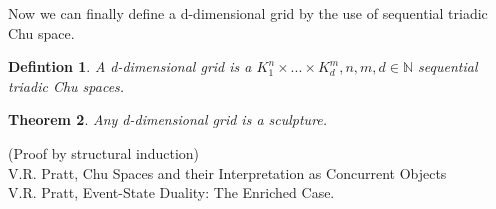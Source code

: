 \documentclass[a4paper,11pt]{article}
\newtheorem{theorem}{Theorem}
\newtheorem{lemma}[theorem]{Lemma}
\newtheorem{definition}[theorem]{Defintion}
\begin{document}

Now we can finally define a d-dimensional grid by the use of sequential triadic Chu space.

\begin{definition}
    A d-dimensional grid is a $K^{n}_{1} \times ... \times K^{m}_{d}, n,m,d \in \mathbb{N}$ sequential triadic Chu spaces.
\end{definition}

\begin{theorem}
    Any d-dimensional grid is a sculpture.
\end{theorem}

(Proof by structural induction)\\


%
%
%
%






\noindent [1] V.R. Pratt, Chu Spaces and their Interpretation as Concurrent Objects\\
\noindent [2] V.R. Pratt, Event-State Duality: The Enriched Case.
\end{document}
